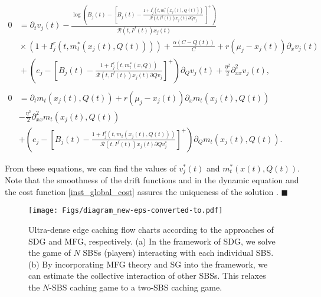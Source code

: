 \documentclass{book}
\begin{document}
    {
    \begin{align}
    0&= \partial_t v_{j}(t) -\frac{\log \left(B_{j}(t)-\left[B_{j}(t)- \frac{1+I^r_j(t,m_t^*(x_j(t),\!Q(t)))}{\mathcal{R}(t,I^f(t))x_j(t)\partial{\scriptscriptstyle{Q}}{v_{j}}}    \right]^{\scriptscriptstyle{+}}\right)}{\mathcal{R}(t,I^f(t))x_j(t)} \nonumber \\
     &\!\times \!(1\!+\!I^r_j(t,\!m_t^*(x_j(t),\!Q(t)\!)\!)\!)+\!\frac{\alpha(C\!-\!Q(t))}{C}\!+\!r(\mu_j\!-\!x_j(t)\!)\partial_x v_{j}(t)\nonumber \\
     &\!+\! \left(\!e_j \!-\!\left[\!B_{j}(t)\!- \!\frac{\!1\!+\!I^r_j(t,m_t^*(x,\!Q))}{\mathcal{R}(t,I^f(t))x_j(t)\partial{\scriptscriptstyle{Q}}{v_{j}}}\!\right]^{\!\scriptscriptstyle{+}}\right) \!\partial_{Q}v_{j}(t)\!+\! \frac{\eta^2}{2}\partial_{xx}^2 v_{j}(t), \nonumber\\
     \nonumber\\
    0&= \partial_t m_t(x_j(t),Q(t)) +r(\mu_j-x_j(t))\partial_x m_t(x_j(t),Q(t)) 
    \nonumber\\&- \frac{\eta^2}{2}\partial_{xx}^2 m_t(x_j(t),Q(t))
    \nonumber \\&+\! \left(\!e_j \!-\!\left[\!B_{j}(t)\!- \!\frac{\!1\!+\!I^r_j(t,m_t(x_j(t),Q(t)))}{\mathcal{R}(t,I^f(t))x_j(t)\partial{\scriptscriptstyle{Q}}{v_{j}^*}}\!\right]^{\!\scriptscriptstyle{+}}\right) \!\partial_{Q}m_t(x_j(t),\!Q(t)). \nonumber%
    \end{align}}
    
    \noindent From these equations, we can find the values of
    $v_j^*(t)$ and $m_t^*(x(t),Q(t))$. Note that the smoothness of the drift functions and in the dynamic equation and the cost function \eqref{inst_global_cost} assures the uniqueness of the solution \cite{exist_HJBsol1}. \hfill$\blacksquare$ 
    \vskip 10pt
    
    \begin{figure}
    \centering
    \texttt{[image: Figs/diagram\_new-eps-converted-to.pdf]}   %
    \caption{\small{Ultra-dense edge caching flow charts according to the approaches of SDG and MFG, respectively. (a) In the framework of SDG, we solve the game of $N$ SBSs (players)  interacting with each individual SBS. (b) By incorporating  MFG theory and SG into the framework, we can estimate the collective interaction of other SBSs. This relaxes the $N$-SBS caching game to a two-SBS caching game. }  }\label{diagram} 
    \end{figure}
    
\end{document}
